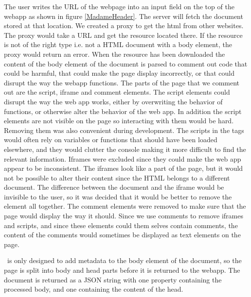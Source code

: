 The user writes the URL of the webpage into an input field on the top of the webapp as shown in figure \ref{MadameHeader}.
The server will fetch the document stored at that location.
We created a proxy to get the html from other websites.
The proxy would take a URL and get the resource located there.
If the resource is not of the right type i.e. not a HTML document with a body element,
the proxy would return an error.
When the resource has been downloaded the content of the body element of the document is parsed to comment out code that
could be harmful, that could make the page display incorrectly, or that could disrupt the way the webapp functions.
The parts of the page that we comment out are the script, iframe and comment elements.
The script elements could disrupt the way the web app works, either by overwriting the behavior of functions,
or otherwise alter the behavior of the web app.
In addition the script elements are not visible on the page so interacting with them would be hard.
Removing them was also convenient during development.
The scripts in the tags would often rely on variables or functions that should have been loaded elsewhere,
and they would clutter the console making it more difficult to find the relevant information.
Iframes were excluded since they could make the web app appear to be inconsistent.
The iframes look like a part of the page,
but it would not be possible to alter their content since the HTML belongs to a different document.
The difference between the document and the iframe would be invisible to the user,
so it was decided that it would be better to remove the element all together.
The comment elements were removed to make sure that the page would display the way it should.
Since we use comments to remove iframes and scripts, and since these elements could them selves contain comments,
the content of the comments would sometimes be displayed as text elements on the page.

\Theartefact\ is only designed to add metadata to the body element of the document,
so the page is split into body and head parts before it is returned to the webapp.
The document is returned as a JSON string with one property containing the processed body,
and one containing the content of the head.


